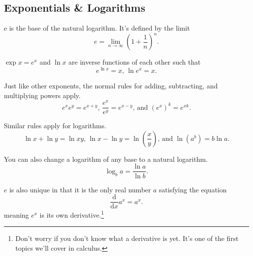 \subsection{Exponentials \& Logarithms}
\begin{definition}
	e is the base of the natural logarithm. It's defined by the limit
	\begin{equation*}
		e = \lim\limits_{n\rightarrow\infty}{\left(1+\frac{1}{n}\right)^n}.
	\end{equation*}
\end{definition}


$\exp{x} = e^x$ and $\ln{x}$ are inverse functions of each other such that
\begin{equation*}
	e^{\ln{x}} = x \text{, } \ln{e^x} = x.
\end{equation*}


Just like other exponents, the normal rules for adding, subtracting, and multiplying powers apply.
\begin{equation*}
	e^xe^y = e^{x+y}\text{, }\frac{e^x}{e^y}=e^{x-y}\text{, and }\left(e^x\right)^k=e^{xk}.
\end{equation*}


Similar rules apply for logarithms.
\begin{equation*}
	\ln{x}+\ln{y} = \ln{xy}\text{, }\ln{x}-\ln{y} = \ln{\left(\frac{x}{y}\right)}\text{, and }\ln{\left(a^b\right)}=b\ln{a}.
\end{equation*}


You can also change a logarithm of any base to a natural logarithm.
\begin{equation*}
	\log_{b}{a} = \frac{\ln{a}}{\ln{b}}.
\end{equation*}


$e$ is also unique in that it is the only real number $a$ satisfying the equation
\begin{equation*}
	\frac{\mathrm{d}}{\mathrm{d}x}a^x = a^x.
\end{equation*}
meaning $e^x$ is its own derivative.\footnote{Don't worry if you don't know what a derivative is yet. It's one of the first topics we'll cover in calculus.}
